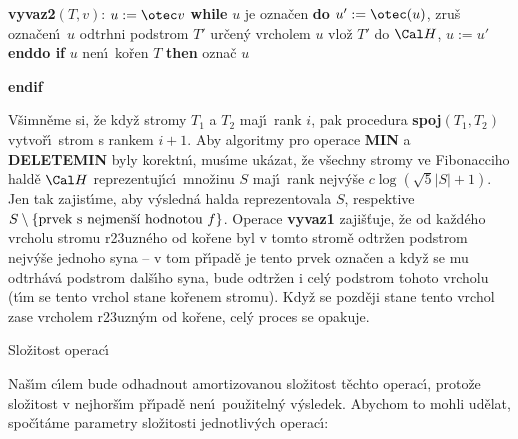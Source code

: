 \documentclass[a4paper,12pt]{article}
\begin{document}
{\bf vyvaz2$(T,v)$}:\newline 
$u:=\otec v$\newline 
{\bf while} $u$ je ozna\v cen {\bf do\newline 
\phantom{{\rm ---}}$u':=\otec(u)$}, zru\v s ozna\v cen\'\i\ $u$\newline 
\phantom{---}odtrhni podstrom $T'$ ur\v cen\'y vrcholem $u$\newline 
\phantom{---}vlo\v z $T'$ do $\Cal H$, $u:=u'$\newline 
{\bf enddo\newline 
if} $u$ nen\'\i\ ko\v ren $T$ {\bf then} ozna\v c $u$ {\bf endif
\bigskip

}\flushpar V\v simn\v eme si, \v ze kdy\v z stromy $T_1$ a $T_2$ maj\'\i\ rank 
$i$, pak procedura {\bf spoj$(T_1,T_2)$} vytvo\v r\'\i\ strom s rankem 
$i+1$.  Aby algoritmy pro operace {\bf MIN} a {\bf DELETEMIN} byly 
korektn\'\i , mus\'\i me uk\'azat, \v ze v\v sechny stromy ve 
Fibonacciho hald\v e $\Cal H$ reprezentuj\'\i c\'\i\ mno\v zinu $
S$ maj\'\i\ rank 
nejv\'y\v se $c\log(\sqrt 5|S|+1)$. Jen tak zajist\'\i me, aby v\'ysledn\'a 
halda reprezentovala $S$, res\-pektive 
$S\setminus \{\text{\rm prvek s nejmen\v s\'\i\ hodnotou }f\}$.  Operace {\bf vyvaz1 }
zaji\v s\v tuje, \v ze od ka\v zd\'eho vrcholu stromu r\accent23uzn\'eho 
od ko\v rene byl v tomto strom\v e odtr\v zen podstrom nejv\'y\v se 
jednoho syna -- v tom p\v r\'\i pad\v e je tento prvek ozna\v cen a 
kdy\v z se mu odtrh\'av\'a podstrom dal\v s\'\i ho syna, bude odtr\v zen 
i cel\'y podstrom tohoto vrcholu (t\'\i m se tento vrchol stane ko\v renem 
stromu).  Kdy\v z se pozd\v eji stane tento vrchol zase 
vrcholem r\accent23uzn\'ym od ko\v rene, cel\'y proces se 
opakuje. 
\bigskip

\head
Slo\v zitost operac\'\i
\endhead

\flushpar Na\v s\'\i m c\'\i lem bude odhadnout amortizovanou slo\v zitost t\v echto 
operac\'\i , proto\v ze slo\v zitost v nejhor\v s\'\i m p\v r\'\i pad\v e nen\'\i\ 
pou\v ziteln\'y v\'ysledek.  Abychom to mohli ud\v elat, spo\v c\'\i t\'ame parametry 
slo\v zitosti jednotliv\'ych operac\'\i :  
\medskip
\end{document}

